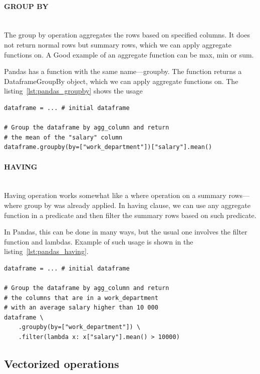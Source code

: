 \paragraph{GROUP BY} \leavevmode \\

The group by operation aggregates the rows based on specified columns.
It does not return normal rows but summary rows, which we can apply aggregate functions on.
A Good example of an aggregate function can be max, min or sum.

Pandas has a function with the same name---groupby.
The function returns a DataframeGroupBy object, which we can apply aggregate functions on.
The listing~\ref{lst:pandas_groupby} shows the usage

\begin{lstlisting}[caption=Group by in Pandas, label={lst:pandas_groupby}, captionpos=b]
dataframe = ... # initial dataframe

# Group the dataframe by agg_column and return
# the mean of the "salary" column
dataframe.groupby(by=["work_department"])["salary"].mean()
\end{lstlisting}

\paragraph{HAVING} \leavevmode \\

Having operation works somewhat like a where operation on a summary rows---where group by was already applied.
In having clause, we can use any aggregate function in a predicate and then filter the summary rows based on such
predicate.

In Pandas, this can be done in many ways, but the usual one involves the filter function and lambdas.
Example of such usage is shown in the listing~\ref{lst:pandas_having}.

\begin{lstlisting}[caption=Having in Pandas, label={lst:pandas_having}, captionpos=b]
dataframe = ... # initial dataframe

# Group the dataframe by agg_column and return
# the columns that are in a work_department
# with an average salary higher than 10 000
dataframe \
    .groupby(by=["work_department"]) \
    .filter(lambda x: x["salary"].mean() > 10000)
\end{lstlisting}


\subsection{Vectorized operations}

